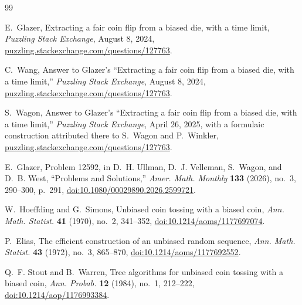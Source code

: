 \documentclass[11pt]{article}
\theoremstyle{definition}
\theoremstyle{remark}
\begin{document}
\begin{thebibliography}{99}

E.~Glazer,
\newblock Extracting a fair coin flip from a biased die, with a time limit,
\newblock \emph{Puzzling Stack Exchange}, August 8, 2024,
\newblock \href{https://puzzling.stackexchange.com/questions/127763/extracting-a-fair-coin-flip-from-a-biased-die-with-a-time-limit}
{puzzling.stackexchange.com/questions/127763}.

C.~Wang,
\newblock Answer to Glazer's ``Extracting a fair coin flip from a biased die, with a time limit,''
\newblock \emph{Puzzling Stack Exchange}, August 8, 2024,
\newblock \href{https://puzzling.stackexchange.com/questions/127763/extracting-a-fair-coin-flip-from-a-biased-die-with-a-time-limit}
{puzzling.stackexchange.com/questions/127763}.

S.~Wagon,
\newblock Answer to Glazer's ``Extracting a fair coin flip from a biased die, with a time limit,''
\newblock \emph{Puzzling Stack Exchange}, April 26, 2025,
\newblock with a formulaic construction attributed there to S.~Wagon and P.~Winkler,
\newblock \href{https://puzzling.stackexchange.com/questions/127763/extracting-a-fair-coin-flip-from-a-biased-die-with-a-time-limit}
{puzzling.stackexchange.com/questions/127763}.

E.~Glazer,
\newblock Problem 12592,
\newblock in D.~H. Ullman, D.~J. Velleman, S.~Wagon, and D.~B. West,
``Problems and Solutions,''
\emph{Amer. Math. Monthly} \textbf{133} (2026), no.~3, 290--300, p.~291,
\newblock \href{https://doi.org/10.1080/00029890.2026.2599721}
{doi:10.1080/00029890.2026.2599721}.

W.~Hoeffding and G.~Simons,
\newblock Unbiased coin tossing with a biased coin,
\newblock \emph{Ann. Math. Statist.} \textbf{41} (1970), no.~2, 341--352,
\newblock \href{https://doi.org/10.1214/aoms/1177697074}
{doi:10.1214/aoms/1177697074}.

P.~Elias,
\newblock The efficient construction of an unbiased random sequence,
\newblock \emph{Ann. Math. Statist.} \textbf{43} (1972), no.~3, 865--870,
\newblock \href{https://doi.org/10.1214/aoms/1177692552}
{doi:10.1214/aoms/1177692552}.

Q.~F. Stout and B.~Warren,
\newblock Tree algorithms for unbiased coin tossing with a biased coin,
\newblock \emph{Ann. Probab.} \textbf{12} (1984), no.~1, 212--222,
\newblock \href{https://doi.org/10.1214/aop/1176993384}
{doi:10.1214/aop/1176993384}.


\end{thebibliography}
\end{document}
